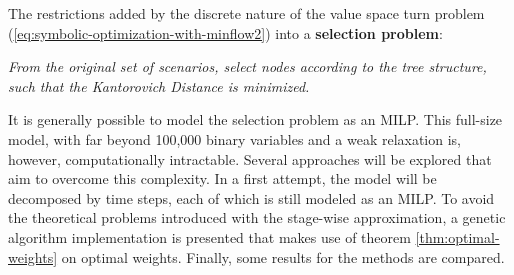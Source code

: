 The restrictions added by the discrete nature of the value space turn problem (\ref{eq:symbolic-optimization-with-minflow2}) into a \textbf{selection problem}:
\begin{center}
  \textit{From the original set of scenarios, select nodes according to the tree structure, such that the Kantorovich Distance is minimized.}
\end{center}
It is generally possible to model the selection problem as an MILP. 
This full-size model, with far beyond 100,000 binary variables and a weak relaxation is, however, computationally intractable.
Several approaches will be explored that aim to overcome this complexity.
In a first attempt, the model will be decomposed by time steps, each of which is still modeled as an MILP.
To avoid the theoretical problems introduced with the stage-wise approximation, a genetic algorithm implementation is presented that makes use of theorem \ref{thm:optimal-weights} on optimal weights.
Finally, some results for the methods are compared.

